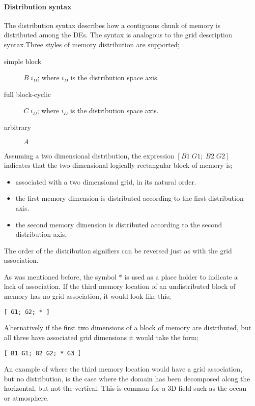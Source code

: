 \paragraph{Distribution syntax}
The distribution syntax describes how a contiguous chunk of memory is distributed among the DEs. 
The syntax is analogous to the grid description syntax.Three styles of memory distribution are supported;
\begin{description}
   \item[simple block] $B \; i_D$; where $i_D$ is the distribution space axis.
   \item[full block-cyclic] $C \; i_D$; where $i_D$ is the distribution space axis.  
   \item[arbitrary] $A$ 
\end{description}
Assuming a two dimensional distribution, the expression $[ B1 \; G1; \; B2 \; G2 ]$ indicates 
that the two dimensional logically rectangular block of memory is;
\begin{itemize}
	\item associated with a two dimensional grid, in its natural order.
	\item the first memory dimension is distributed according to the first distribution axis.
	\item the second memory dimension is distributed according to the second distribution axis.
\end{itemize}
The order of the distribution signifiers can be reversed just as with the grid association. 

As was mentioned before, the symbol $\ast$ is used as a place holder to indicate a lack of association. 
If the third memory location of an undistributed block of memory has no grid association, it would look like this;
\begin{center}
\begin{verbatim}
[ G1; G2; * ]
\end{verbatim}
\end{center}
Alternatively if the first two dimensions of a block of memory are distributed, 
but all three have associated grid dimensions it would take the form;
\begin{center}
\begin{verbatim}
[ B1 G1; B2 G2; * G3 ]
\end{verbatim}
\end{center}
An example of where the third memory location would have a grid association, but no distribution, 
is the case where the domain has been decomposed along the horizontal, but not the vertical. 
This is common for a 3D field such as the ocean or atmosphere. 

